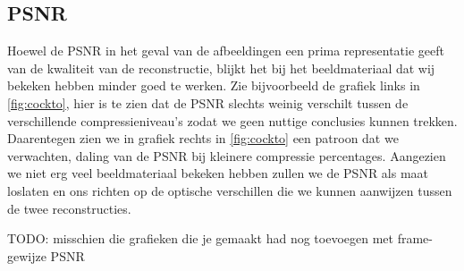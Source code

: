 \subsection{PSNR}
Hoewel de PSNR in het geval van de afbeeldingen een prima representatie geeft van de kwaliteit van de 
reconstructie, blijkt het bij het beeldmateriaal dat wij bekeken hebben minder goed te werken. 
Zie bijvoorbeeld de grafiek links in \ref{fig:cockto}, hier is te zien dat de PSNR slechts weinig verschilt
tussen de verschillende compressieniveau's zodat we geen nuttige conclusies kunnen trekken.
Daarentegen zien we in grafiek rechts in \ref{fig:cockto} een patroon dat we verwachten, daling van de PSNR
bij kleinere compressie percentages.
Aangezien we niet erg veel beeldmateriaal bekeken hebben zullen we de PSNR als maat loslaten en ons richten 
op de optische verschillen die we kunnen aanwijzen tussen de twee reconstructies.

TODO: misschien die grafieken die je gemaakt had nog toevoegen met frame-gewijze PSNR

